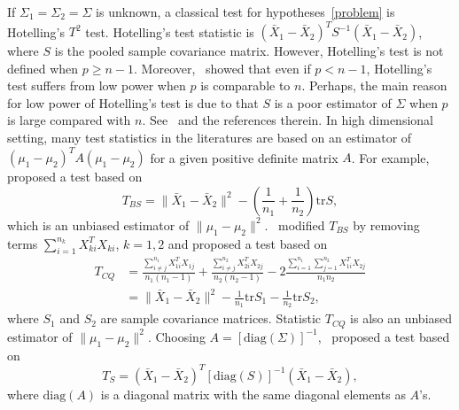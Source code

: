 If $\Sigma_1=\Sigma_2=\Sigma$ is unknown, a classical test for hypotheses~\eqref{problem} is Hotelling's $T^2$ test.  Hotelling's test statistic is ${(\bar{X}_1-\bar{X}_2)}^T S^{-1}(\bar{X}_1-\bar{X}_2)$, where $S$ is the pooled sample covariance matrix. However, Hotelling's test is not defined when $p\geq n-1$.
Moreover,~\cite{Bai1996Efiect} showed that even if $p<n-1$, Hotelling's test suffers from low power when $p$ is comparable to $n$.
Perhaps, the main reason for low power of Hotelling's test is due to that $S$ is a poor estimator of $\Sigma$ when $p$ is large compared with $n$. See~\cite{Chen2010A} and the references therein.
In high dimensional setting,  
many test statistics in the literatures are based on an estimator of ${(\mu_1-\mu_2)}^T A(\mu_1-\mu_2)$ for a given positive definite matrix $A$. 
For example,~\cite{Bai1996Efiect} proposed a test based on
\begin{equation*}
    T_{BS}=\|\bar{X}_1-\bar{X}_2\|^2-(\frac{1}{n_1}+\frac{1}{n_2})\mathrm{tr}S,
\end{equation*}
which is an unbiased estimator of $\|\mu_1-\mu_2\|^2$.~\cite{Chen2010A} modified $T_{BS}$ by removing terms $\sum_{i=1}^{n_k}X_{ki}^T X_{ki}$, $k=1,2$ and proposed a test based on
\begin{equation*}
    \begin{aligned}
        T_{CQ}&=\frac{\sum_{i\neq j}^{n_1}X_{1i}^T X_{1j}}{n_1(n_1-1)}+\frac{\sum_{i\neq j}^{n_2}X_{2i}^T X_{2j}}{n_2(n_2-1)}-2\frac{\sum_{i=1}^{n_1}\sum_{j=1}^{n_2}X_{1i}^T X_{2j}}{n_1n_2}
        \\
            &=\|\bar{X}_1-\bar{X}_2\|^2-\frac{1}{n_1}\mathrm{tr}S_1-\frac{1}{n_2}\mathrm{tr}S_2,
    \end{aligned}
\end{equation*}
where $S_1$ and $S_2$ are sample covariance matrices. Statistic $T_{CQ}$ 
is also an unbiased estimator of $\|\mu_1-\mu_2\|^2$. Choosing $A={[\mathrm{diag}(\Sigma)]}^{-1}$,~\cite{Srivastava2008A} proposed a test based on
\begin{equation*}
    T_{S}={(\bar{X}_1-\bar{X}_2)}^T {[\mathrm{diag}(S)]}^{-1}(\bar{X}_1-\bar{X}_2),
\end{equation*}
where $\textrm{diag} (A)$ is a diagonal matrix with the same diagonal elements as $A$'s.

